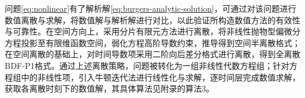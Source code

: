\documentclass{GZUbachelorthesis}
\theoremstyle{chineseplain}
\begin{document}
问题\eqref{eq:nonlinear}有了解析解\eqref{eq:burgers-analytic-solution}，可通过对该问题进行数值离散与求解，将数值解与解析解进行对比，以此验证所构造数值方法的有效性与可靠性。在空间方向上，采用分片有限元方法进行离散，将非线性抛物型偏微分方程投影至有限维函数空间，弱化方程高阶导数约束，推导得到空间半离散格式；在空间离散的基础上，对时间导数项采用二阶向后差分格式进行离散，得到全离散BDF-P1格式。通过上述离散策略，问题被转化为一组非线性代数方程组；针对方程组中的非线性项，引入牛顿迭代法进行线性化与求解，逐时间层完成数值求解，获取各离散时刻下的数值解，其具体算法见附录的算法3。
\end{document}
